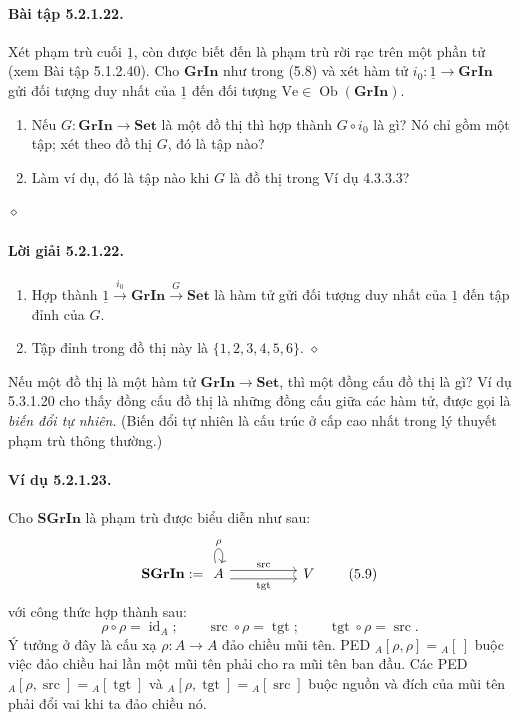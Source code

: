 \paragraph{Bài tập 5.2.1.22.} Xét phạm trù cuối $\underline{1}$, còn được biết đến là phạm trù rời rạc trên một phần tử (xem Bài tập 5.1.2.40). Cho $\mathbf{GrIn}$ như trong (5.8) và xét hàm tử $i_0:\underline{1}\to\mathbf{GrIn}$ gửi đối tượng duy nhất của $\underline{1}$ đến đối tượng $\mathrm{Ve}\in\operatorname{Ob}(\mathbf{GrIn})$.
\begin{enumerate}[label=\alph*.]
\item Nếu $G:\mathbf{GrIn}\to\mathbf{Set}$ là một đồ thị thì hợp thành $G\circ i_0$ là gì? Nó chỉ gồm một tập; xét theo đồ thị $G$, đó là tập nào?
\item Làm ví dụ, đó là tập nào khi $G$ là đồ thị trong Ví dụ 4.3.3.3?
\end{enumerate}\hfill$\diamond$
\paragraph{Lời giải 5.2.1.22.}
\begin{enumerate}[label=\alph*.]
\item Hợp thành $\underline{1}\xrightarrow{i_0}\mathbf{GrIn}\xrightarrow{G}\mathbf{Set}$ là hàm tử gửi đối tượng duy nhất của $\underline{1}$ đến tập đỉnh của $G$.
\item Tập đỉnh trong đồ thị này là $\{1,2,3,4,5,6\}$.
\nobreak\hfill$\diamond$
\end{enumerate}

Nếu một đồ thị là một hàm tử $\mathbf{GrIn}\to\mathbf{Set}$, thì một đồng cấu đồ thị là gì? Ví dụ 5.3.1.20 cho thấy đồng cấu đồ thị là những đồng cấu giữa các hàm tử, được gọi là \emph{biến đổi tự nhiên}. (Biến đổi tự nhiên là cấu trúc ở cấp cao nhất trong lý thuyết phạm trù thông thường.)
\paragraph{Ví dụ 5.2.1.23.} Cho $\mathbf{SGrIn}$ là phạm trù được biểu diễn như sau:
\begin{equation*}\mathbf{SGrIn}:=\begin{tikzcd}[column sep=huge]A\arrow[loop above,"\rho"]\arrow[r,shift left=3pt,"\operatorname{src}"]\arrow[r,shift right=3pt,"\operatorname{tgt}"']&V\end{tikzcd}\tag{5.9}\end{equation*}
với công thức hợp thành sau:
\[\rho\circ\rho=\operatorname{id}_A;\qquad\operatorname{src}\circ\rho=\operatorname{tgt};\qquad\operatorname{tgt}\circ\rho=\operatorname{src}.\]
Ý tưởng ở đây là cấu xạ $\rho:A\to A$ đảo chiều mũi tên. PED ${}_{A}[\rho,\rho]={}_{A}[\,]$ buộc việc đảo chiều hai lần một mũi tên phải cho ra mũi tên ban đầu. Các PED ${}_{A}[\rho,\operatorname{src}]={}_{A}[\operatorname{tgt}]$ và ${}_{A}[\rho,\operatorname{tgt}]={}_{A}[\operatorname{src}]$ buộc nguồn và đích của mũi tên phải đổi vai khi ta đảo chiều nó.

